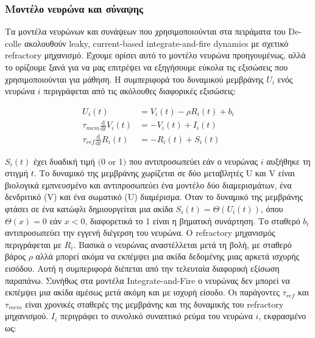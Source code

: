 \documentclass[12pt]{report}
\begin{document}
\subsubsection{Μοντέλο νευρώνα και σύναψης}
Τα μοντέλα νευρώνων και συνάψεων που χρησιμοποιούνται στα πειράματα του \textlatin{Decolle} ακολουθούν \textlatin{leaky, current-based integrate-and-fire dynamics} με σχετικό \textlatin{refractory} μηχανισμό. Έχουμε ορίσει αυτό το μοντέλο νευρώνα προηγουμένως, αλλά το ορίζουμε ξανά για να μας επιτρέψει να εξηγήσουμε εύκολα τις εξισώσεις που χρησιμοποιούνται για μάθηση. Η συμπεριφορά του δυναμικού μεμβράνης $U_{i}$ ενός νευρώνα $i$ περιγράφεται από τις ακόλουθες διαφορικές εξισώσεις:

\begin{equation}
\begin{aligned}
U_{i}(t) &=V_{i}(t)-\rho R_{i}(t)+b_{i} \\
\tau_{m e m} \frac{\mathrm{d}}{\mathrm{d} t} V_{i}(t) &=-V_{i}(t)+I_{i}(t) \\
\tau_{r e f} \frac{\mathrm{d}}{\mathrm{d} t} R_{i}(t) &=-R_{i}(t)+S_{i}(t)
\end{aligned}
\end{equation}

$S_{i}(t)$ έχει δυαδική τιμή $(0$ or 1$)$ που αντιπροσωπεύει εάν ο νευρώνας $i$ αυξήθηκε τη στιγμή $t$. Το δυναμικό της μεμβράνης χωρίζεται σε δύο μεταβλητές \textlatin{U} και \textlatin{V} είναι βιολογικά εμπνευσμένο και αντιπροσωπεύει ένα μοντέλο δύο διαμερισμάτων, ένα δενδριτικό (\textlatin{V}) και ένα σωματικό (\textlatin{U}) διαμέρισμα. Όταν το δυναμικό της μεμβράνης φτάσει σε ένα κατώφλι δημιουργείται μια ακίδα $S_{i}(t)=\Theta\left(U_{i}(t)\right)$, όπου $\Theta(x)=0$ εάν $x<0$, διαφορετικά το 1 είναι η βηματική συνάρτηση. Το σταθερό $b_{i}$  αντιπροσωπεύει την εγγενή διέγερση του νευρώνα. Ο \textlatin{refractory} μηχανισμός περιγράφεται με $R_{i}$. Βασικά ο νευρώνας αναστέλλεται μετά τη βολή, με σταθερό βάρος $\rho$ αλλά μπορεί ακόμα να εκπέμψει μια ακίδα δεδομένης μιας αρκετά ισχυρής εισόδου. Αυτή η συμπεριφορά διέπεται από την τελευταία διαφορική εξίσωση παραπάνω. Συνήθως στα μοντέλα \textlatin{Integrate-and-Fire} ο νευρώνας δεν μπορεί να εκπέμψει μια ακίδα αμέσως μετά ακόμη και με ισχυρή είσοδο. Οι παράγοντες $\tau_{r e f}$ και $\tau_{m e m}$ είναι χρονικές σταθερές της μεμβράνης και της δυναμικής του \textlatin{refractory} μηχανισμού. $I_{i}$ περιγράφει το συνολικό συναπτικό ρεύμα του νευρώνα $i$, εκφρασμένο ως:
\end{document}
